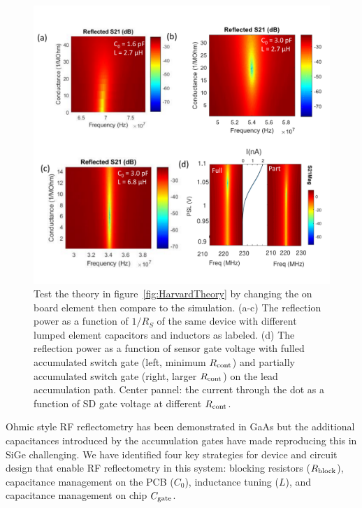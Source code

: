 \documentclass[twocolumn]{article}
\begin{document}
\begin{figure}
	\includegraphics[width = \columnwidth]{Illustrations/HarvardFigure3_v5.pdf}
	\caption{Test the theory in figure\ \ref{fig:HarvardTheory} by changing the on board element then compare to the simulation.			
	(a-c) The reflection power as a function of $1/R_S$ of the same device with different lumped element capacitors and inductors as labeled. 		
	(d) The reflection power as a function of sensor gate voltage with fulled accumulated switch gate (left, minimum $R_{\rm cont}$) and partially accumulated switch gate (right, larger $R_{\rm cont}$) on the lead accumulation path. Center pannel: the current through the dot as a function of SD gate voltage at different $R_{\rm cont}$.}
	\label{fig:Harvardresult}
\end{figure}



	Ohmic style RF reflectometry has been demonstrated in GaAs but the additional capacitances introduced by the accumulation gates have made reproducing this in SiGe challenging.  We have identified four key strategies for device and circuit design that enable RF reflectometry in this system: blocking resistors ($R_{\rm block}$), capacitance management on the PCB ($C_0$), inductance tuning ($L$), and capacitance management on chip $C_{\rm gate}$.  
	
\end{document}

